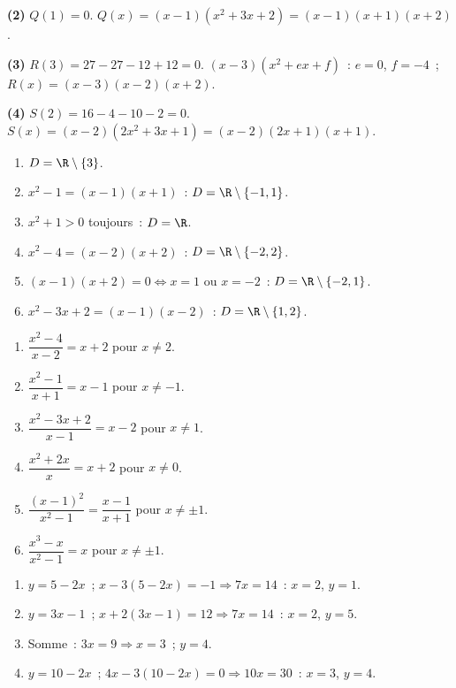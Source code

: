 \textbf{(2)} $Q(1)=0$.\checkmark\quad
$Q(x)=(x-1)(x^2+3x+2)=(x-1)(x+1)(x+2)$.

\textbf{(3)} $R(3)=27-27-12+12=0$.\checkmark\quad
$(x-3)(x^2+ex+f)$~: $e=0$, $f=-4$~; $R(x)=(x-3)(x-2)(x+2)$.

\textbf{(4)} $S(2)=16-4-10-2=0$.\checkmark\quad
$S(x)=(x-2)(2x^2+3x+1)=(x-2)(2x+1)(x+1)$.


\begin{enumerate}
  \item $D=\R\setminus\{3\}$.
  \item $x^2-1=(x-1)(x+1)$~: $D=\R\setminus\{-1,1\}$.
  \item $x^2+1>0$ toujours~: $D=\R$.
  \item $x^2-4=(x-2)(x+2)$~: $D=\R\setminus\{-2,2\}$.
  \item $(x-1)(x+2)=0\Leftrightarrow x=1$ ou $x=-2$~: $D=\R\setminus\{-2,1\}$.
  \item $x^2-3x+2=(x-1)(x-2)$~: $D=\R\setminus\{1,2\}$.
\end{enumerate}


\begin{enumerate}
  \item $\dfrac{x^2-4}{x-2}=x+2$ pour $x\ne2$.
  \item $\dfrac{x^2-1}{x+1}=x-1$ pour $x\ne-1$.
  \item $\dfrac{x^2-3x+2}{x-1}=x-2$ pour $x\ne1$.
  \item $\dfrac{x^2+2x}{x}=x+2$ pour $x\ne0$.
  \item $\dfrac{(x-1)^2}{x^2-1}=\dfrac{x-1}{x+1}$ pour $x\ne\pm1$.
  \item $\dfrac{x^3-x}{x^2-1}=x$ pour $x\ne\pm1$.
\end{enumerate}


\begin{enumerate}
  \item $y=5-2x$~; $x-3(5-2x)=-1\Rightarrow7x=14$~: $x=2$, $y=1$.
  \item $y=3x-1$~; $x+2(3x-1)=12\Rightarrow7x=14$~: $x=2$, $y=5$.
  \item Somme~: $3x=9\Rightarrow x=3$~; $y=4$.
  \item $y=10-2x$~; $4x-3(10-2x)=0\Rightarrow10x=30$~: $x=3$, $y=4$.
\end{enumerate}

